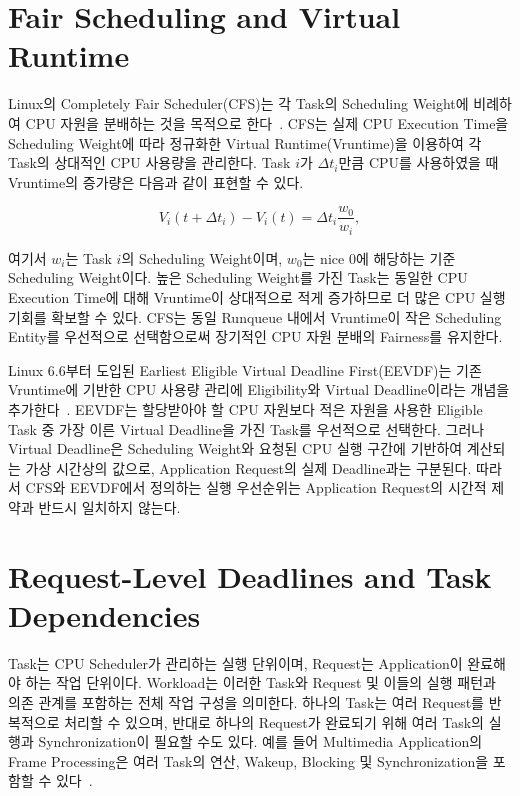 


\section{Fair Scheduling and Virtual Runtime}
\label{sec:background-fair-scheduling-and-virtual-runtime}

Linux의 Completely Fair Scheduler(CFS)는 각 Task의 Scheduling
Weight에 비례하여 CPU 자원을 분배하는 것을 목적으로 한다~\cite{cfs}.
CFS는 실제 CPU Execution Time을 Scheduling Weight에 따라
정규화한 Virtual Runtime(Vruntime)을 이용하여 각 Task의 상대적인
CPU 사용량을 관리한다.
Task $i$가 $\Delta t_i$만큼 CPU를 사용하였을 때 Vruntime의
증가량은 다음과 같이 표현할 수 있다.

\begin{equation}
    V_i(t+\Delta t_i)-V_i(t) = \Delta t_i \frac{w_0}{w_i},
\end{equation}

여기서 $w_i$는 Task $i$의 Scheduling Weight이며,
$w_0$는 nice 0에 해당하는 기준 Scheduling Weight이다.
높은 Scheduling Weight를 가진 Task는 동일한 CPU Execution Time에 대해
Vruntime이 상대적으로 적게 증가하므로 더 많은 CPU 실행 기회를
확보할 수 있다.
CFS는 동일 Runqueue 내에서 Vruntime이 작은 Scheduling Entity를
우선적으로 선택함으로써 장기적인 CPU 자원 분배의 Fairness를
유지한다.

Linux 6.6부터 도입된 Earliest Eligible Virtual Deadline
First(EEVDF)는 기존 Vruntime에 기반한 CPU 사용량 관리에
Eligibility와 Virtual Deadline이라는 개념을 추가한다~\cite{stoica1995,eevdf_linux}.
EEVDF는 할당받아야 할 CPU 자원보다 적은 자원을 사용한
Eligible Task 중 가장 이른 Virtual Deadline을 가진 Task를
우선적으로 선택한다.
그러나 Virtual Deadline은 Scheduling Weight와 요청된
CPU 실행 구간에 기반하여 계산되는 가상 시간상의 값으로,
Application Request의 실제 Deadline과는 구분된다.
따라서 CFS와 EEVDF에서 정의하는 실행 우선순위는
Application Request의 시간적 제약과 반드시 일치하지 않는다.


\section{Request-Level Deadlines and Task Dependencies}
\label{sec:background-request-level-deadlines-and-task-dependencies}

Task는 CPU Scheduler가 관리하는 실행 단위이며,
Request는 Application이 완료해야 하는 작업 단위이다.
Workload는 이러한 Task와 Request 및 이들의 실행 패턴과
의존 관계를 포함하는 전체 작업 구성을 의미한다.
하나의 Task는 여러 Request를 반복적으로 처리할 수 있으며,
반대로 하나의 Request가 완료되기 위해 여러 Task의 실행과
Synchronization이 필요할 수도 있다.
예를 들어 Multimedia Application의 Frame Processing은
여러 Task의 연산, Wakeup, Blocking 및 Synchronization을
포함할 수 있다~\cite{abeni1998,androidrender}.

